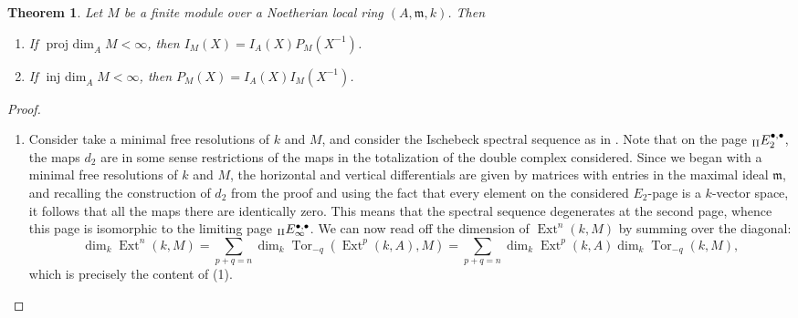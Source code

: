 \documentclass[11pt]{article}
\theoremstyle{thmstyle}
\newtheorem{theorem}{Theorem}
\theoremstyle{defstyle}
\newcommand{\Tor}{\operatorname{Tor}}
\newcommand{\frakm}{\mathfrak{m}} %
\newcommand{\Ext}{\operatorname{Ext}}
\newcommand{\projdim}{\operatorname{proj~dim}}
\newcommand{\injdim}{\operatorname{inj~dim}}
\begin{document}
\begin{theorem}
    Let $M$ be a finite module over a Noetherian local ring $(A,\frakm, k)$. Then 
    \begin{enumerate}[label=(\arabic*)]
        \item If $\projdim_A M < \infty$, then $I_M(X) = I_A(X)P_M(X^{-1})$.
        \item If $\injdim_A M < \infty$, then $P_M(X) = I_A(X) I_M(X^{-1})$.
    \end{enumerate}
\end{theorem}
\begin{proof}
    \begin{enumerate}[label=(\arabic*)]
    \item Consider take a minimal free resolutions of $k$ and $M$, and consider the Ischebeck spectral sequence as in . Note that on the page ${}_{\rm II}E_2^{\bullet,\bullet}$, the maps $d_2$ are in some sense restrictions of the maps in the totalization of the double complex considered. Since we began with a minimal free resolutions of $k$ and $M$, the horizontal and vertical differentials are given by matrices with entries in the maximal ideal $\frakm$, and recalling the construction of $d_2$ from the proof  and using the fact that every element on the considered $E_2$-page is a $k$-vector space, it follows that all the maps there are identically zero. This means that the spectral sequence degenerates at the second page, whence this page is isomorphic to the limiting page ${}_{\rm II}E_\infty^{\bullet, \bullet}$. We can now read off the dimension of $\Ext^n(k, M)$ by summing over the diagonal: 
    \begin{equation*}
        \dim_k\Ext^n(k, M) = \sum_{p + q = n}\dim_k\Tor_{-q}\left(\Ext^p(k, A), M\right) = \sum_{p + q = n}\dim_k\Ext^p(k, A)\dim_k\Tor_{-q}(k, M),
    \end{equation*}
    which is precisely the content of (1).


\end{enumerate}
\end{proof}
\end{document}
